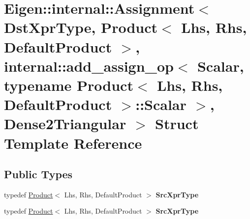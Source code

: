 \hypertarget{struct_eigen_1_1internal_1_1_assignment_3_01_dst_xpr_type_00_01_product_3_01_lhs_00_01_rhs_00_01efc05729801ac09d27a309f4f0923f27}{}\section{Eigen\+:\+:internal\+:\+:Assignment$<$ Dst\+Xpr\+Type, Product$<$ Lhs, Rhs, Default\+Product $>$, internal\+:\+:add\+\_\+assign\+\_\+op$<$ Scalar, typename Product$<$ Lhs, Rhs, Default\+Product $>$\+:\+:Scalar $>$, Dense2\+Triangular $>$ Struct Template Reference}
\label{struct_eigen_1_1internal_1_1_assignment_3_01_dst_xpr_type_00_01_product_3_01_lhs_00_01_rhs_00_01efc05729801ac09d27a309f4f0923f27}
\subsection*{Public Types}
\begin{DoxyCompactItemize}
\item 
\mbox{\label{struct_eigen_1_1internal_1_1_assignment_3_01_dst_xpr_type_00_01_product_3_01_lhs_00_01_rhs_00_01efc05729801ac09d27a309f4f0923f27_a6fe3d17d2688fd663e852200d8cf8579}} 
typedef \hyperlink{group___core___module_class_eigen_1_1_product}{Product}$<$ Lhs, Rhs, Default\+Product $>$ {\bfseries Src\+Xpr\+Type}
\item 
\mbox{\label{struct_eigen_1_1internal_1_1_assignment_3_01_dst_xpr_type_00_01_product_3_01_lhs_00_01_rhs_00_01efc05729801ac09d27a309f4f0923f27_a6fe3d17d2688fd663e852200d8cf8579}} 
typedef \hyperlink{group___core___module_class_eigen_1_1_product}{Product}$<$ Lhs, Rhs, Default\+Product $>$ {\bfseries Src\+Xpr\+Type}
\end{DoxyCompactItemize}
